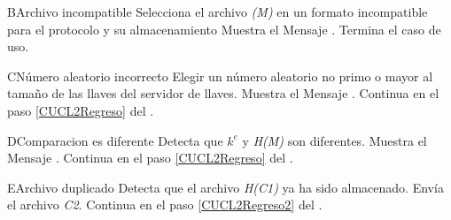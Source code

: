 \begin{UCtrayectoriaA}{B}{Archivo incompatible}
	\UCpaso [\UCactor] Selecciona el archivo \textit{(M)} en un formato incompatible para el protocolo y su almacenamiento
	\UCpaso Muestra el Mensaje .
	\UCpaso Termina el caso de uso.
\end{UCtrayectoriaA}

\begin{UCtrayectoriaA}{C}{Número aleatorio incorrecto}
	\UCpaso Elegir un número aleatorio no primo o mayor al tamaño de las llaves del servidor de llaves.
	\UCpaso Muestra el Mensaje .
	\UCpaso Continua en el paso \ref{CUCL2Regreso} del .
\end{UCtrayectoriaA}

\begin{UCtrayectoriaA}{D}{Comparacion es diferente}
	\UCpaso Detecta que \textit{$k^{e}$} y \textit{H(M)} son diferentes.
	\UCpaso Muestra el Mensaje .
	\UCpaso Continua en el paso \ref{CUCL2Regreso} del .
\end{UCtrayectoriaA}

\begin{UCtrayectoriaA}{E}{Archivo duplicado}
	\UCpaso Detecta que el archivo \textit{H(C1)} ya ha sido almacenado.
	\UCpaso Envía el archivo \textit{C2}.
	\UCpaso Continua en el paso \ref{CUCL2Regreso2} del .
\end{UCtrayectoriaA}
